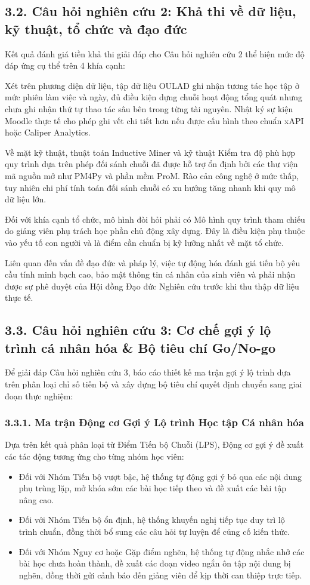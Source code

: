 \subsection{3.2. Câu hỏi nghiên cứu 2: Khả thi về dữ liệu, kỹ thuật, tổ chức và đạo đức}
Kết quả đánh giá tiền khả thi giải đáp cho Câu hỏi nghiên cứu 2 thể hiện mức độ đáp ứng cụ thể trên 4 khía cạnh:

Xét trên phương diện dữ liệu, tập dữ liệu OULAD ghi nhận tương tác học tập ở mức phiên làm việc và ngày, đủ điều kiện dựng chuỗi hoạt động tổng quát nhưng chưa ghi nhận thứ tự thao tác sâu bên trong từng tài nguyên. Nhật ký sự kiện Moodle thực tế cho phép ghi vết chi tiết hơn nếu được cấu hình theo chuẩn xAPI hoặc Caliper Analytics.

Về mặt kỹ thuật, thuật toán Inductive Miner và kỹ thuật Kiểm tra độ phù hợp quy trình dựa trên phép đối sánh chuỗi đã được hỗ trợ ổn định bởi các thư viện mã nguồn mở như PM4Py và phần mềm ProM. Rào cản công nghệ ở mức thấp, tuy nhiên chi phí tính toán đối sánh chuỗi có xu hướng tăng nhanh khi quy mô dữ liệu lớn.

Đối với khía cạnh tổ chức, mô hình đòi hỏi phải có Mô hình quy trình tham chiếu do giảng viên phụ trách học phần chủ động xây dựng. Đây là điều kiện phụ thuộc vào yếu tố con người và là điểm cần chuẩn bị kỹ lưỡng nhất về mặt tổ chức.

Liên quan đến vấn đề đạo đức và pháp lý, việc tự động hóa đánh giá tiến bộ yêu cầu tính minh bạch cao, bảo mật thông tin cá nhân của sinh viên và phải nhận được sự phê duyệt của Hội đồng Đạo đức Nghiên cứu trước khi thu thập dữ liệu thực tế.

\subsection{3.3. Câu hỏi nghiên cứu 3: Cơ chế gợi ý lộ trình cá nhân hóa \& Bộ tiêu chí Go/No-go}
Để giải đáp Câu hỏi nghiên cứu 3, báo cáo thiết kế ma trận gợi ý lộ trình dựa trên phân loại chỉ số tiến bộ và xây dựng bộ tiêu chí quyết định chuyển sang giai đoạn thực nghiệm:

\subsubsection{3.3.1. Ma trận Động cơ Gợi ý Lộ trình Học tập Cá nhân hóa}
Dựa trên kết quả phân loại từ Điểm Tiến bộ Chuỗi (LPS), Động cơ gợi ý đề xuất các tác động tương ứng cho từng nhóm học viên:
\begin{itemize}
    \item Đối với Nhóm Tiến bộ vượt bậc, hệ thống tự động gợi ý bỏ qua các nội dung phụ trùng lặp, mở khóa sớm các bài học tiếp theo và đề xuất các bài tập nâng cao.
    \item Đối với Nhóm Tiến bộ ổn định, hệ thống khuyến nghị tiếp tục duy trì lộ trình chuẩn, đồng thời bổ sung các câu hỏi tự luyện để củng cố kiến thức.
    \item Đối với Nhóm Nguy cơ hoặc Gặp điểm nghẽn, hệ thống tự động nhắc nhở các bài học chưa hoàn thành, đề xuất các đoạn video ngắn ôn tập nội dung bị nghẽn, đồng thời gửi cảnh báo đến giảng viên để kịp thời can thiệp trực tiếp.
\end{itemize}

